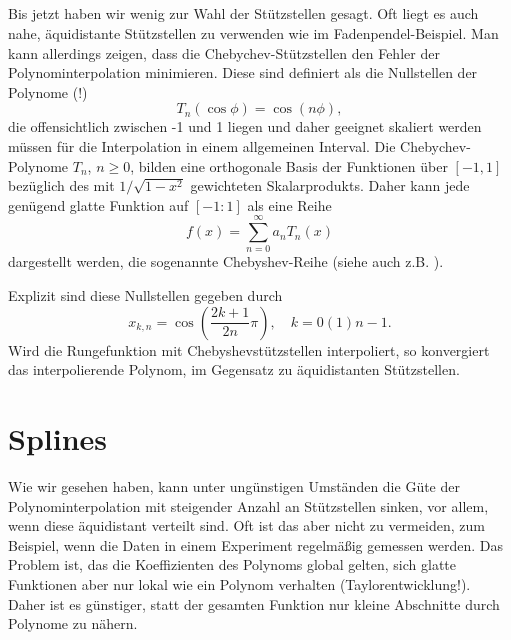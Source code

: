 \subsection{}

Bis jetzt haben wir wenig zur Wahl der Stützstellen gesagt. Oft liegt
es auch nahe, äquidistante Stützstellen zu verwenden wie im
Fadenpendel-Beispiel. Man kann allerdings zeigen, dass die
Chebychev-Stützstellen den Fehler der Polynominterpolation minimieren.
Diese sind definiert als die Nullstellen der Polynome (!)
\begin{equation}
  T_n(\cos\phi) = \cos(n\phi),
\end{equation}
die offensichtlich zwischen -1 und 1 liegen und daher geeignet
skaliert werden müssen für die Interpolation in einem allgemeinen
Interval. Die Chebychev-Polynome $T_n$, $n\ge 0$, bilden eine
orthogonale Basis der Funktionen über $[-1,1]$ bezüglich des mit
$1/\sqrt{1-x^2}$ gewichteten Skalarprodukts. Daher kann jede genügend
glatte Funktion auf $[-1:1]$ als eine Reihe
\begin{equation}
  f(x) = \sum_{n=0}^\infty a_n T_n(x)
\end{equation}
dargestellt werden, die sogenannte Chebyshev-Reihe (siehe auch z.B.
\textcite{abramowitz70a}).

 Explizit sind diese Nullstellen gegeben durch
\begin{equation}
  x_{k,n} = \cos\left(\frac{2k+1}{2n}\pi\right),\quad k=0(1)n-1.
\end{equation}
Wird die Rungefunktion mit Chebyshevstützstellen interpoliert, so
konvergiert das interpolierende Polynom, im Gegensatz zu äquidistanten
Stützstellen.

\section{Splines}

Wie wir gesehen haben, kann unter ungünstigen Umständen die Güte der
Polynominterpolation mit steigender Anzahl an Stützstellen sinken, vor
allem, wenn diese äquidistant verteilt sind. Oft ist das aber nicht zu
vermeiden, zum Beispiel, wenn die Daten in einem Experiment regelmäßig
gemessen werden. Das Problem ist, das die Koeffizienten des Polynoms
global gelten, sich glatte Funktionen aber nur lokal wie ein Polynom
verhalten (Taylorentwicklung!). Daher ist es günstiger, statt der
gesamten Funktion nur kleine Abschnitte durch Polynome zu nähern.

